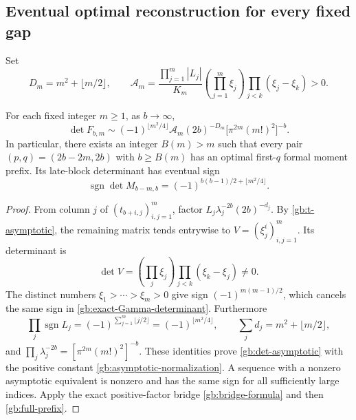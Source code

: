 \subsection{Eventual optimal reconstruction for every fixed gap}

Set
\begin{equation}\label{gb:asymptotic-normalization}
 D_m=m^2+\lfloor m/2\rfloor,\qquad
 \mathcal A_m=
 \frac{\prod_{j=1}^m|L_j|}{K_m}
       \left(\prod_{j=1}^m\xi_j\right)
       \prod_{j<k}(\xi_j-\xi_k)>0.
\end{equation}

\begin{theorem}\label{gb:eventual}
For each fixed integer $m\ge1$, as $b\to\infty$,
\begin{equation}\label{gb:det-asymptotic}
 \boxed{\displaystyle
 \det F_{b,m}\sim
 (-1)^{\lfloor m^2/4\rfloor}\mathcal A_m
 (2b)^{-D_m}\bigl[\pi^{2m}(m!)^2\bigr]^{-b}.}
\end{equation}
In particular, there exists an integer $B(m)>m$ such that every
pair $(p,q)=(2b-2m,2b)$ with $b\ge B(m)$ has an optimal first-$q$
formal moment prefix.  Its late-block determinant has eventual sign
\begin{equation}\label{gb:eventual-sign}
 \operatorname{sgn}\det M_{b-m,b}
        =(-1)^{b(b-1)/2+\lfloor m^2/4\rfloor}.
\end{equation}
\end{theorem}

\begin{proof}
From column $j$ of $(t_{b+i,j})_{i,j=1}^m$, factor
$L_j\lambda_j^{-2b}(2b)^{-d_j}$.  By
\eqref{gb:t-asymptotic}, the remaining matrix tends entrywise to
$V=(\xi_j^i)_{i,j=1}^m$.  Its determinant is
\[
 \det V=\left(\prod_j\xi_j\right)
                   \prod_{j<k}(\xi_k-\xi_j)\ne0.
\]
The distinct numbers $\xi_1>\cdots>\xi_m>0$ give sign
$(-1)^{m(m-1)/2}$, which cancels the same sign in
\eqref{gb:exact-Gamma-determinant}.  Furthermore
\[
 \prod_j\operatorname{sgn}L_j
    =(-1)^{\sum_{j=1}^m\lfloor j/2\rfloor}
    =(-1)^{\lfloor m^2/4\rfloor},\qquad
 \sum_jd_j=m^2+\lfloor m/2\rfloor,
\]
and
$\prod_j\lambda_j^{-2b}=[\pi^{2m}(m!)^2]^{-b}$.
These identities prove \eqref{gb:det-asymptotic} with the positive
constant \eqref{gb:asymptotic-normalization}.  A sequence with a
nonzero asymptotic equivalent is nonzero and has the same sign
for all sufficiently large indices.  Apply the exact positive-factor
bridge \eqref{gb:bridge-formula} and then \eqref{gb:full-prefix}.
\end{proof}

